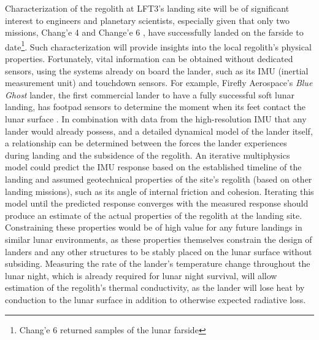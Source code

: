 Characterization of the regolith at LFT3's landing site will be of significant interest to engineers and planetary scientists, especially given that only two missions, Chang'e 4 \citep{wimmer2020lnd} and Change'e 6 \citep{Ren2025ChangE6}, have successfully landed on the farside to date\footnote{Chang'e 6 returned samples of the lunar farside}. Such characterization will provide insights into the local regolith's physical properties.  Fortunately, vital information can be obtained without dedicated sensors, using the systems already on board the lander, such as its IMU (inertial measurement unit) and touchdown sensors.  For example, Firefly Aerospace's \textit{Blue Ghost} lander, the first commercial lander to have a fully successful soft lunar landing, has footpad sensors to determine the moment when its feet contact the lunar surface \citep{Firefly2025BlueGhost}.  In combination with data from the high-resolution IMU that any lander would already possess, and a detailed dynamical model of the lander itself, a relationship can be determined between the forces the lander experiences during landing and the subsidence of the regolith.  An iterative multiphysics model could predict the IMU response based on the established timeline of the landing and assumed geotechnical properties of the site's regolith (based on other landing missions), such as its angle of internal friction and cohesion.  Iterating this model until the predicted response converges with the measured response should produce an estimate of the actual properties of the regolith at the landing site.  Constraining these properties would be of high value for any future landings in similar lunar environments, as these properties themselves constrain the design of landers and any other structures to be stably placed on the lunar surface without subsiding.  Measuring the rate of the lander's temperature change throughout the lunar night, which is already required for lunar night survival, will allow estimation of the regolith's thermal conductivity, as the lander will lose heat by conduction to the lunar surface in addition to otherwise expected radiative loss.

